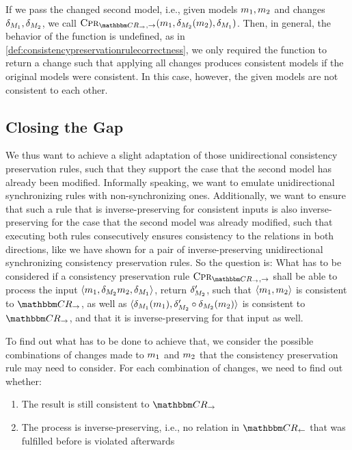 If we pass the changed second model, i.e., given models $m_{1},m_{2}$ and changes $\delta_{M_{1}},\delta_{M_{2}}$, we call $\consistencypreservationrule{\consistencyrelationset{CR}_{\rightarrow},\rightarrow}(\model{m}{1},\change{\metamodel{M}{2}}(\model{m}{2}),\change{\metamodel{M}{1}})$.
Then, in general, the behavior of the function is undefined, as in \autoref{def:consistencypreservationrulecorrectness}, we only required the function to return a change such that applying all changes produces consistent models if the original models were consistent.
In this case, however, the given models are not consistent to each other.


\subsection{Closing the Gap}

We thus want to achieve a slight adaptation of those unidirectional consistency preservation rules, such that they support the case that the second model has already been modified.
Informally speaking, we want to emulate unidirectional synchronizing rules with non-synchronizing ones.
Additionally, we want to ensure that such a rule that is inverse-preserving for consistent inputs is also inverse-preserving for the case that the second model was already modified, such that executing both rules consecutively ensures consistency to the relations in both directions, like we have shown for a pair of inverse-preserving unidirectional synchronizing consistency preservation rules.
So the question is:
What has to be considered if a consistency preservation rule $\consistencypreservationrule{\consistencyrelationset{CR}_{\rightarrow},\rightarrow}$ shall be able to process the input $\langle m_{1},\delta_{M_{2}}m_{2},\delta_{M_{1}} \rangle$, return $\delta_{M_{2}}'$, such that $\langle m_{1},m_{2} \rangle$ is consistent to $\consistencyrelationset{CR}_{\rightarrow}$, as well as $\langle \delta_{M_{1}}(m_{1}),\delta_{M_{2}}' \circ \delta_{M_{2}}(m_{2}) \rangle$ is consistent to $\consistencyrelationset{CR}_{\rightarrow}$, and that it is inverse-preserving for that input as well.

To find out what has to be done to achieve that, we consider the possible combinations of changes made to $m_{1}$ and $m_{2}$ that the consistency preservation rule may need to consider.
For each combination of changes, we need to find out whether:
\begin{enumerate}
    \item The result is still consistent to $\consistencyrelationset{CR}_{\rightarrow}$
    \item The process is inverse-preserving, i.e., no relation in $\consistencyrelationset{CR}_{\leftarrow}$ that was fulfilled before is violated afterwards
\end{enumerate}

